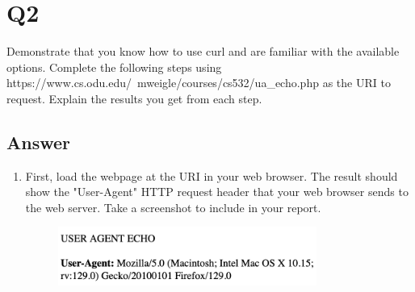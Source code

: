 \documentclass[12pt]{article}
\begin{document}
\section*{Q2}

Demonstrate that you know how to use curl and are familiar with the available options. Complete the following steps using https://www.cs.odu.edu/~mweigle/courses/cs532/ua\_echo.php as the URI to request. Explain the results you get from each step.

\subsection*{Answer}

\begin{enumerate}
    \item First, load the webpage at the URI in your web browser. The result should show the "User-Agent" HTTP request header that your web browser sends to the web server. Take a screenshot to include in your report.
    \begin{figure}[h!]
        \centering
        \includegraphics[width=0.8\textwidth] {q2-a.jpg}
        \label{fig:http-request-header}
    \end{figure}


\end{enumerate}
\end{document}
